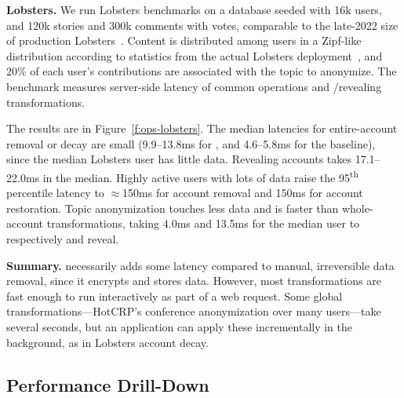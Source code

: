 \textbf{Lobsters.}
%
We run Lobsters benchmarks on a database seeded with 16k users, and
120k stories and 300k comments with votes, comparable to the late-2022 size of
production Lobsters~\cite{lobsters}.
%
Content is distributed among users in a Zipf-like distribution according to
statistics from the actual Lobsters deployment~\cite{lobsters-data}, and 20\% of
each user's contributions are associated with the topic to anonymize.
%
The benchmark measures server-side latency of common operations and
\xxing/revealing transformations.
%
%
%
%

%
The results are in Figure~\ref{f:ops-lobsters}.
%
The median latencies for entire-account removal or decay are small (9.9--13.8ms
for \sys, and 4.6--5.8ms for the baseline), since the median Lobsters user has
little data. Revealing \xxed accounts takes 17.1--22.0ms in the median.
%
Highly active users with lots of data raise the 95\textsuperscript{th}
percentile latency to $\approx$150ms for account removal and 150ms for account
restoration.
%
Topic anonymization touches less data and is faster than whole-account
transformations, taking 4.0ms and 13.5ms for the median user to respectively \xx
and reveal.
%

\textbf{Summary.}
%
\sys necessarily adds some latency compared to manual, irreversible data
removal, since it encrypts and stores \xxed data.
%
However, most \xxing transformations are fast enough to run interactively as
part of a web request.
%
Some global \xxing transformations---\eg HotCRP's conference anonymization over
many users---take several seconds, but an application can apply these
incrementally in the background, as in Lobsters account decay.
%

\subsection{\sys Performance Drill-Down}
\label{s:eval-additional}

